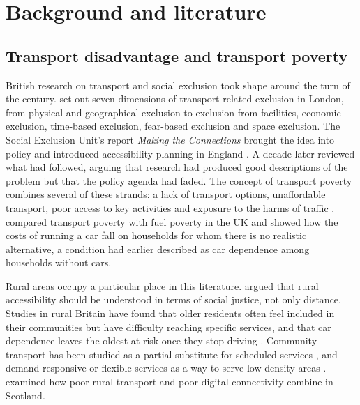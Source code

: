 \documentclass[11pt,a4paper]{article}
\begin{document}
\section{Background and literature}\label{sec:lit}
\subsection{Transport disadvantage and transport poverty}
British research on transport and social exclusion took shape around the turn of the century. \citet{church2000} set out seven dimensions of transport-related exclusion in London, from physical and geographical exclusion to exclusion from facilities, economic exclusion, time-based exclusion, fear-based exclusion and space exclusion. The Social Exclusion Unit's report \textit{Making the Connections} brought the idea into policy and introduced accessibility planning in England \citep{seu2003}. A decade later \citet{lucas2012} reviewed what had followed, arguing that research had produced good descriptions of the problem but that the policy agenda had faded. The concept of transport poverty combines several of these strands: a lack of transport options, unaffordable transport, poor access to key activities and exposure to the harms of traffic \citep{lucas2016}. \citet{mattioli2017} compared transport poverty with fuel poverty in the UK and showed how the costs of running a car fall on households for whom there is no realistic alternative, a condition \citet{mattioli2014} had earlier described as car dependence among households without cars.

Rural areas occupy a particular place in this literature. \citet{farrington2005} argued that rural accessibility should be understood in terms of social justice, not only distance. Studies in rural Britain have found that older residents often feel included in their communities but have difficulty reaching specific services, and that car dependence leaves the oldest at risk once they stop driving \citep{shergold2012}. Community transport has been studied as a partial substitute for scheduled services \citep{gray2006}, and demand-responsive or flexible services as a way to serve low-density areas \citep{mulley2009}. \citet{velaga2012} examined how poor rural transport and poor digital connectivity combine in Scotland.
\end{document}
